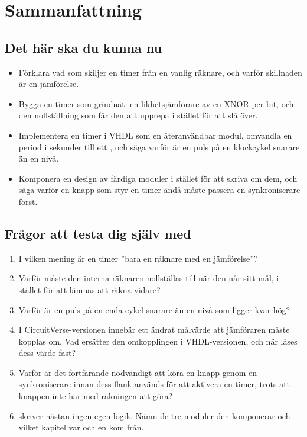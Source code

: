
\section{Sammanfattning}
\label{c7:sec:review}

\subsection*{Det här ska du kunna nu}
\begin{itemize}
  \item Förklara vad som skiljer en timer från en vanlig räknare, och varför skillnaden är en
    jämförelse.
  \item Bygga en timer som grindnät: en likhetsjämförare av en XNOR per bit, och den nollställning
    som får den att upprepa i stället för att slå över.
  \item Implementera en timer i VHDL som en återanvändbar modul, omvandla en period i sekunder till
    ett , och säga varför  är en puls på en klockcykel snarare än en
    nivå.
  \item Komponera en design av färdiga moduler i stället för att skriva om dem, och säga varför en
    knapp som styr en timer ändå måste passera en synkroniserare först.
\end{itemize}

\subsection*{Frågor att testa dig själv med}
\begin{enumerate}
  \item I vilken mening är en timer ”bara en räknare med en jämförelse”?
  \item Varför måste den interna räknaren nollställas till  när den når sitt mål, i stället
    för att lämnas att räkna vidare?
  \item Varför är  en puls på en enda cykel snarare än en nivå som ligger kvar hög?
  \item I CircuitVerse-versionen innebär ett ändrat målvärde att jämföraren måste kopplas om. Vad
    ersätter den omkopplingen i VHDL-versionen, och när låses dess värde fast?
  \item Varför är det fortfarande nödvändigt att köra en knapp genom en synkroniserare innan dess
    flank används för att aktivera en timer, trots att knappen inte har med räkningen att göra?
  \item {} skriver nästan ingen egen logik. Nämn de tre moduler den komponerar och
    vilket kapitel var och en kom från.
\end{enumerate}

